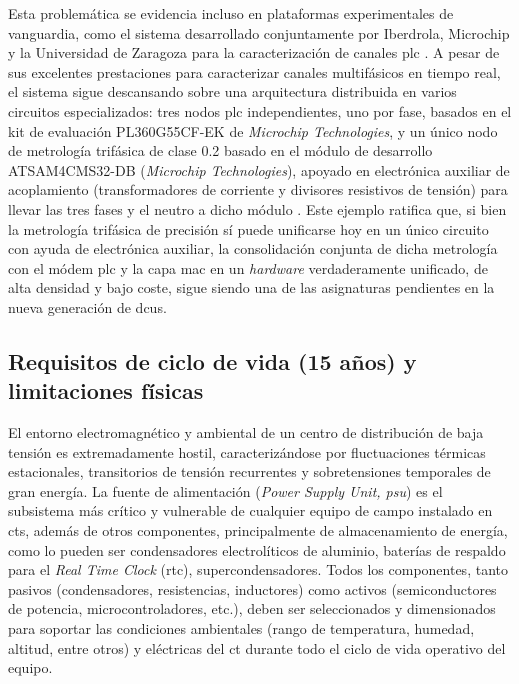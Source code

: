 Esta problemática se evidencia incluso en plataformas experimentales de vanguardia, como el sistema desarrollado conjuntamente por Iberdrola, Microchip y la Universidad de Zaragoza para la caracterización de canales \gls{plc} \cite{10488780}. A pesar de sus excelentes prestaciones para caracterizar canales multifásicos en tiempo real, el sistema sigue descansando sobre una arquitectura distribuida en varios circuitos especializados: tres nodos \gls{plc} independientes, uno por fase, basados en el kit de evaluación PL360G55CF-EK de \textit{Microchip Technologies}, y un único nodo de metrología trifásica de clase 0.2 basado en el módulo de desarrollo ATSAM4CMS32-DB (\textit{Microchip Technologies}), apoyado en electrónica auxiliar de acoplamiento (transformadores de corriente y divisores resistivos de tensión) para llevar las tres fases y el neutro a dicho módulo \cite{10488780}. Este ejemplo ratifica que, si bien la metrología trifásica de precisión sí puede unificarse hoy en un único circuito con ayuda de electrónica auxiliar, la consolidación conjunta de dicha metrología con el módem \gls{plc} y la capa \gls{mac} en un \textit{hardware} verdaderamente unificado, de alta densidad y bajo coste, sigue siendo una de las asignaturas pendientes en la nueva generación de \glspl{dcu}. %

\subsection{Requisitos de ciclo de vida (15 años) y limitaciones físicas}
\label{subsec:fuente_alimentacion_15anos}

El entorno electromagnético y ambiental de un centro de distribución de baja tensión es extremadamente hostil, caracterizándose por fluctuaciones térmicas estacionales, transitorios de tensión recurrentes y sobretensiones temporales de gran energía. La fuente de alimentación (\textit{Power Supply Unit, \gls{psu}}) es el subsistema más crítico y vulnerable de cualquier equipo de campo instalado en \glspl{ct}, además de otros componentes, principalmente de almacenamiento de energía, como lo pueden ser condensadores electrolíticos de aluminio, baterías de respaldo para el \textit{Real Time Clock} (\gls{rtc}), supercondensadores. Todos los componentes, tanto pasivos (condensadores, resistencias, inductores) como activos (semiconductores de potencia, microcontroladores, etc.), deben ser seleccionados y dimensionados para soportar las condiciones ambientales (rango de temperatura, humedad, altitud, entre otros) y eléctricas del \gls{ct} durante todo el ciclo de vida operativo del equipo.

